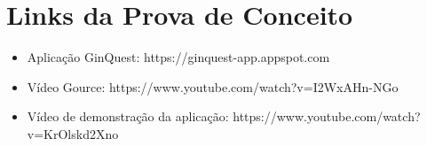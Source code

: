 \documentclass[
    12pt,               %
    openright,          %
    twoside,            %
    a4paper,            %
    openany             %
    draft,              %
    MODELO,             %
    TODO,               %
    english,            %
    brazil              %
    ]{ifsp-spo-inf-ctds}
\begin{document}
\section {Links da Prova de Conceito}

\begin{itemize}
\item Aplicação GinQuest: https://ginquest-app.appspot.com
\item Vídeo Gource: https://www.youtube.com/watch?v=I2WxAHn-NGo
\item Vídeo de demonstração da aplicação: https://www.youtube.com/watch?v=KrOlskd2Xno
\end{itemize}



\end{document}
